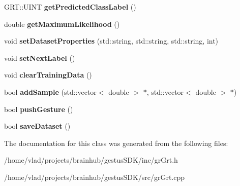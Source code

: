 \begin{DoxyCompactItemize}
G\+R\+T\+::\+U\+I\+NT {\bfseries get\+Predicted\+Class\+Label} ()
\item 
\mbox{\label{classGRGrt_ae8d858e1ffb1c1bebed87998bb0d094f}} 
double {\bfseries get\+Maximum\+Likelihood} ()
\item 
\mbox{\label{classGRGrt_a6e6807059279def6202e89904fe2704e}} 
void {\bfseries set\+Dataset\+Properties} (std\+::string, std\+::string, std\+::string, int)
\item 
\mbox{\label{classGRGrt_adca61031b452e7a1105a8755322c7120}} 
void {\bfseries set\+Next\+Label} ()
\item 
\mbox{\label{classGRGrt_a29bc0a4af10d5a97022c020e69ae14c9}} 
void {\bfseries clear\+Training\+Data} ()
\item 
\mbox{\label{classGRGrt_afbd9af81bc8115a14ad069760c4812ce}} 
bool {\bfseries add\+Sample} (std\+::vector$<$ double $>$ $\ast$, std\+::vector$<$ double $>$ $\ast$)
\item 
\mbox{\label{classGRGrt_ae8b794a630026859046d207d11e9c278}} 
bool {\bfseries push\+Gesture} ()
\item 
\mbox{\label{classGRGrt_a32cc6ef6833fe314702451731a8aee10}} 
bool {\bfseries save\+Dataset} ()
\end{DoxyCompactItemize}


The documentation for this class was generated from the following files\+:\begin{DoxyCompactItemize}
\item 
/home/vlad/projects/brainhub/gestus\+S\+D\+K/inc/gr\+Grt.\+h\item 
/home/vlad/projects/brainhub/gestus\+S\+D\+K/src/gr\+Grt.\+cpp\end{DoxyCompactItemize}
